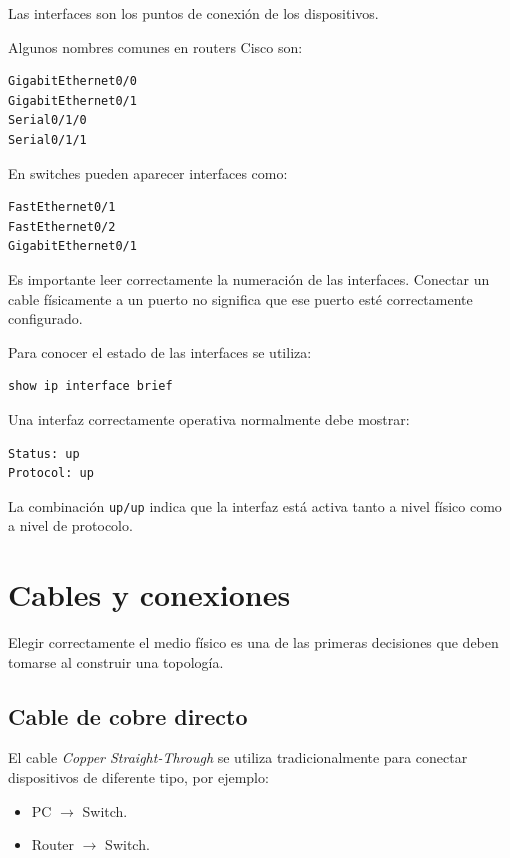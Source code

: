 \documentclass[12pt]{article}
\begin{document}
Las interfaces son los puntos de conexión de los dispositivos.

Algunos nombres comunes en routers Cisco son:

\begin{lstlisting}
GigabitEthernet0/0
GigabitEthernet0/1
Serial0/1/0
Serial0/1/1
\end{lstlisting}

En switches pueden aparecer interfaces como:

\begin{lstlisting}
FastEthernet0/1
FastEthernet0/2
GigabitEthernet0/1
\end{lstlisting}

Es importante leer correctamente la numeración de las interfaces. Conectar
un cable físicamente a un puerto no significa que ese puerto esté
correctamente configurado.

Para conocer el estado de las interfaces se utiliza:

\begin{lstlisting}
show ip interface brief
\end{lstlisting}

Una interfaz correctamente operativa normalmente debe mostrar:

\begin{lstlisting}
Status: up
Protocol: up
\end{lstlisting}

La combinación \texttt{up/up} indica que la interfaz está activa tanto a
nivel físico como a nivel de protocolo.


\section{Cables y conexiones}

Elegir correctamente el medio físico es una de las primeras decisiones que
deben tomarse al construir una topología.

\subsection{Cable de cobre directo}

El cable \textit{Copper Straight-Through} se utiliza tradicionalmente para
conectar dispositivos de diferente tipo, por ejemplo:

\begin{itemize}
    \item PC $\rightarrow$ Switch.
    \item Router $\rightarrow$ Switch.
\end{itemize}
\end{document}
